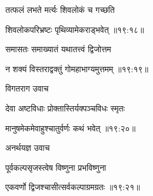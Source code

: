 {\devanagarifont तत्फलं लभते मर्त्यः शिवलोकं च गच्छति \thinspace{\dandab} \dontdisplaylinenum }%


{\devanagarifont शिवलोकपरिभ्रष्टः पृथिव्यामेकराड्भवेत् {॥१९:१८॥} \veg\dontdisplaylinenum }%
 
{\devanagarifont समासतः समाख्यातं यथातत्त्वं द्विजोत्तम \thinspace{\dandab} \dontdisplaylinenum }%
 

{\devanagarifont न शक्यं विस्तराद्वक्तुं गोमहाभाग्यमुत्तमम् {॥१९:१९॥} \veg\dontdisplaylinenum }%


{\devanagarifont विगतराग उवाच {\dandab}\dontdisplaylinenum  }%
 
{\devanagarifont देवा अष्टविधाः प्रोक्तास्तिर्यक्पञ्चविधः स्मृतः \thinspace{\danda} \dontdisplaylinenum }%


{\devanagarifont मानुषमेकमेवाहुश्चातुर्वर्णः कथं भवेत् {॥१९:२०॥} \veg\dontdisplaylinenum }%

{\devanagarifont अनर्थयज्ञ उवाच {\dandab}\dontdisplaylinenum  }%
 
{\devanagarifont पूर्वकल्पसृजस्त्वेष विष्णुना प्रभविष्णुना \thinspace{\danda} \dontdisplaylinenum }%


{\devanagarifont एकवर्णो द्विजश्चासीत्सर्वकल्पाग्रमग्रतः {॥१९:२१॥} \veg\dontdisplaylinenum }%

